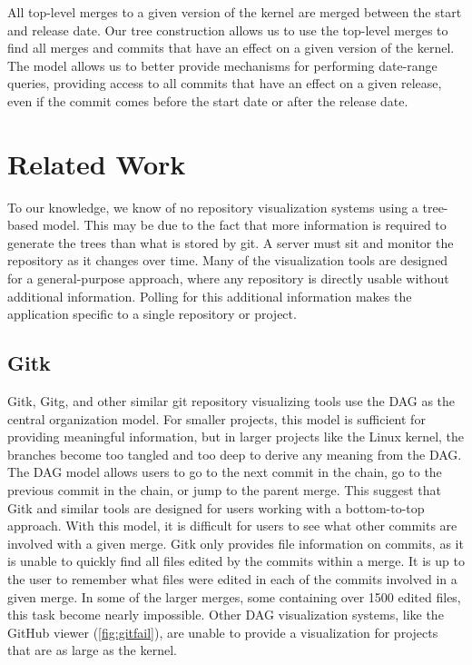 \documentclass[conference, draftclsnofoot]{IEEEtran}
\begin{document}
All top-level merges to a given version of the kernel are merged between the
start and release date. Our tree construction allows us to use the top-level
merges to find all merges and commits that have an effect on a given version of
the kernel. The model allows us to better provide mechanisms for performing
date-range queries, providing access to all commits that have an effect on a
given release, even if the commit comes before the start date or after the
release date.

\section{Related Work}
To our knowledge, we know of no repository visualization systems using a
tree-based model. This may be due to the fact that more information is required
to generate the trees than what is stored by git. A server must sit and monitor
the repository as it changes over time. Many of the visualization tools are
designed for a general-purpose approach, where any repository is directly
usable without additional information. Polling for this additional information
makes the application specific to a single repository or project.

\subsection{Gitk}
Gitk, Gitg, and other similar git repository visualizing tools use the DAG as
the central organization model. For smaller projects, this model is sufficient
for providing meaningful information, but in larger projects like the Linux
kernel, the branches become too tangled and too deep to derive any meaning from
the DAG. The DAG model allows users to go to the next commit in the chain, go
to the previous commit in the chain, or jump to the parent merge. This suggest
that Gitk and similar tools are designed for users working with a bottom-to-top
approach. With this model, it is difficult for users to see what other commits
are involved with a given merge. Gitk only provides file information on
commits, as it is unable to quickly find all files edited by the commits within
a merge. It is up to the user to remember what files were edited in each of the
commits involved in a given merge. In some of the larger merges, some
containing over 1500 edited files, this task become nearly impossible.
Other DAG visualization systems, like the GitHub viewer (\ref{fig:gitfail}),
are unable to provide a visualization for projects that are as large as the
kernel.
\end{document}
